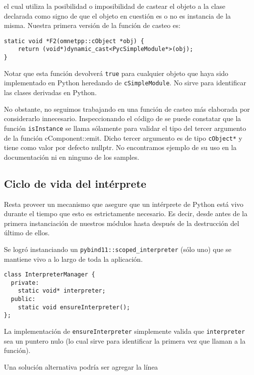 el cual utiliza la posibilidad o imposibilidad de castear el objeto a la clase
declarada como signo de que el objeto en cuestión es o no es instancia de la
misma. Nuestra primera versión de la función de casteo es:

\begin{verbatim}
static void *F2(omnetpp::cObject *obj) {
    return (void*)dynamic_cast<PycSimpleModule*>(obj);
}
\end{verbatim}

Notar que esta función devolverá \verb!true! para cualquier objeto que haya
sido implementado en Python heredando de \verb!cSimpleModule!. No sirve para
identificar las clases derivadas en Python.

No obstante, no seguimos trabajando en una función de casteo más elaborada por
considerarlo innecesario. Inspeccionando el código de \omnetpp{} se puede
constatar que la función \verb!isInstance! se llama sólamente para validar el
tipo del tercer argumento de la función cComponent::emit. Dicho tercer
argumento es de tipo \verb!cObject*! y tiene como valor por defecto nullptr. No
encontramos ejemplo de su uso en la documentación ni en ninguno de los samples.

\subsection{Ciclo de vida del intérprete}\label{subsec:interpreterlifecycle}

Resta proveer un mecanismo que asegure que un intérprete de Python está vivo
durante el tiempo que esto es estrictamente necesario. Es decir, desde antes de
la primera instanciación de nuestros módulos hasta después de la destrucción
del último de ellos.

Se logró instanciando un \verb!pybind11::scoped_interpreter! (sólo uno) que se
mantiene vivo a lo largo de toda la aplicación.

\begin{verbatim}
class InterpreterManager {
  private:
    static void* interpreter;
  public:
    static void ensureInterpreter();
};
\end{verbatim}

La implementación de \verb!ensureInterpreter! simplemente valida que
\verb!interpreter! sea un puntero nulo (lo cual sirve para identificar la
primera vez que llaman a la función).

Una solución alternativa podría ser agregar la línea

